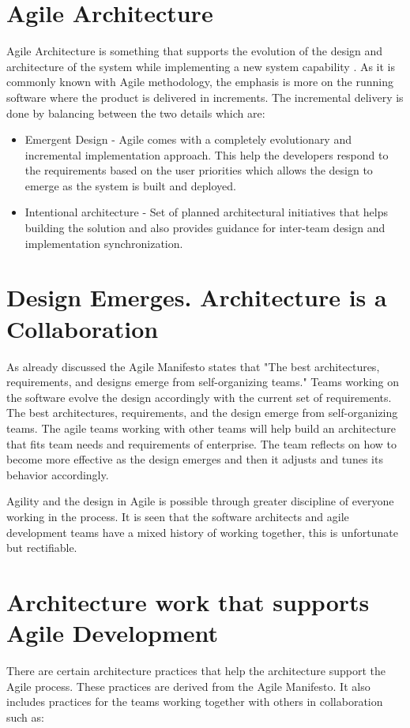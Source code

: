 \documentclass[sigconf]{acmart}
\begin{document}
\section{Agile Architecture}
Agile Architecture is something that supports the evolution of the design and architecture of the system while implementing a new system capability \cite{Saf01}. As it is commonly known with Agile methodology, the emphasis is more on the running software where the product is delivered in increments. The incremental delivery is done by balancing between the two details which are:

\begin{itemize}
  \item Emergent Design - Agile comes with a completely evolutionary and incremental implementation approach. This help the developers respond to the requirements based on the user priorities which allows the design to emerge as the system is built and deployed. 

  \item Intentional architecture - Set of planned architectural initiatives that helps building the solution and also provides guidance for inter-team design and implementation synchronization.
\end{itemize}

\section{Design Emerges. Architecture is a Collaboration}
As already discussed the Agile Manifesto states that "The best architectures, requirements, and designs emerge from self-organizing teams." Teams working on the software evolve the design accordingly with the current set of requirements. The best architectures, requirements, and the design emerge from self-organizing teams. The agile teams working with other teams will help build an architecture that fits team needs and requirements of enterprise. The team reflects on how to become more effective as the design emerges and then it adjusts and tunes its behavior accordingly.

Agility and the design in Agile is possible through greater discipline of everyone working in the process. It is seen that the software architects and agile development teams have a mixed history of working together, this is unfortunate but rectifiable.

\section{Architecture work that supports Agile Development}
There are certain architecture practices that help the architecture support the Agile process. These practices\cite{Eoin1} are derived from the Agile Manifesto\cite{Am01}. It also includes practices for the teams working together with others in collaboration such as:
\end{document}
